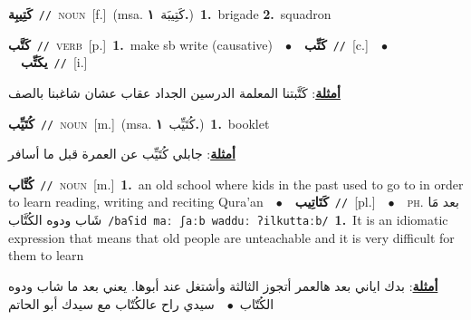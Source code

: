 \documentclass[10pt,a4paper,twoside]{article} %
\begin{document}
\begin{multicols}{2}
{\setlength\topsep{0pt}\textbf{\foreignlanguage{arabic}{كَتِيبِة}}\ {\color{gray}\texttt{//}\color{black}}\ \textsc{noun}\ [f.]\ \color{gray}(msa. \foreignlanguage{arabic}{كَتِيبَة}~\foreignlanguage{arabic}{\textbf{١.}})\color{black}\ \textbf{1.}~brigade  \textbf{2.}~squadron\ } \vspace{2mm}

{\setlength\topsep{0pt}\textbf{\foreignlanguage{arabic}{كَتَّب}}\ {\color{gray}\texttt{//}\color{black}}\ \textsc{verb}\ [p.]\ \textbf{1.}~make sb write (causative)\ \ $\bullet$\ \ \setlength\topsep{0pt}\textbf{\foreignlanguage{arabic}{كَتِّب}}\ {\color{gray}\texttt{//}\color{black}}\ [c.]\ \ $\bullet$\ \ \setlength\topsep{0pt}\textbf{\foreignlanguage{arabic}{يكَتِّب}}\ {\color{gray}\texttt{//}\color{black}}\ [i.]\  \begin{flushright}\color{gray}\foreignlanguage{arabic}{\textbf{\underline{\foreignlanguage{arabic}{أمثلة}}}: كَتَّبتنا المعلمة الدرسين الجداد عقاب عشان شاغبنا بالصف}\end{flushright}\color{black}} \vspace{2mm}

{\setlength\topsep{0pt}\textbf{\foreignlanguage{arabic}{كُتَيِّب}}\ {\color{gray}\texttt{//}\color{black}}\ \textsc{noun}\ [m.]\ \color{gray}(msa. \foreignlanguage{arabic}{كُتَيِّب}~\foreignlanguage{arabic}{\textbf{١.}})\color{black}\ \textbf{1.}~booklet\  \begin{flushright}\color{gray}\foreignlanguage{arabic}{\textbf{\underline{\foreignlanguage{arabic}{أمثلة}}}: جابلي كُتَيِّب عن العمرة قبل ما أسافر}\end{flushright}\color{black}} \vspace{2mm}

{\setlength\topsep{0pt}\textbf{\foreignlanguage{arabic}{كُتَّاب}}\ {\color{gray}\texttt{//}\color{black}}\ \textsc{noun}\ [m.]\ \textbf{1.}~an old school where kids in the past used to go to in order to learn reading, writing and reciting Qura'an\ \ $\bullet$\ \ \setlength\topsep{0pt}\textbf{\foreignlanguage{arabic}{كَتَاتِيب}}\ {\color{gray}\texttt{//}\color{black}}\ [pl.]\ \ $\bullet$\ \ \textsc{ph.} \color{gray} \foreignlanguage{arabic}{بعد مَا شَاب ودوه الكُتَّاب}\color{black}\ {\color{gray}\texttt{/{\sffamily baʕid maː ʃaːb wadduː ʔilkuttaːb}/}\color{black}}\ \textbf{1.}~It is an idiomatic expression that means that old people are unteachable and it is very difficult for them to learn\  \begin{flushright}\color{gray}\foreignlanguage{arabic}{\textbf{\underline{\foreignlanguage{arabic}{أمثلة}}}: بدك اياني بعد هالعمر أتجوز الثالثة وأشتغل عند أبوها. يعني بعد ما شاب ودوه الكُتّاب\ $\bullet$\ \  سيدي راح عالكُتّاب مع سيدك أبو الحاتم}\end{flushright}\color{black}} \vspace{2mm}


\end{multicols}
\end{document}
